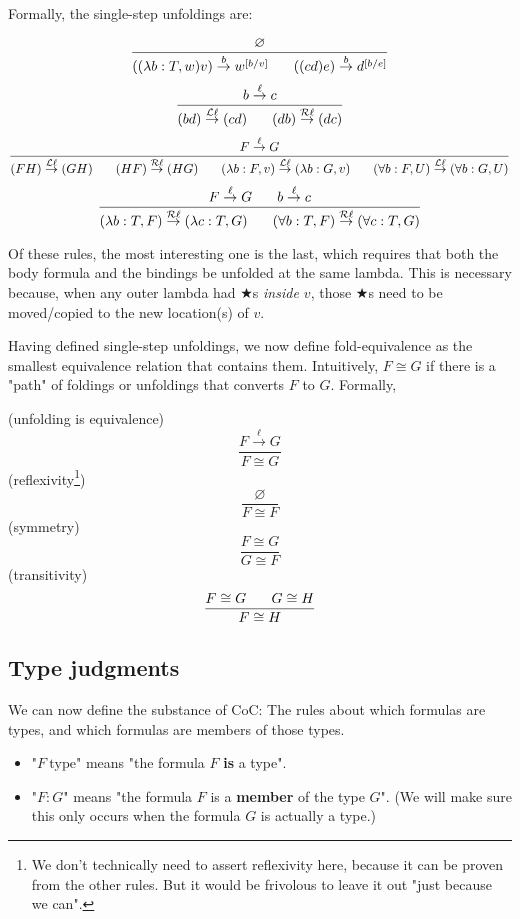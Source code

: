 \documentclass{article}
\newcommand{\istype}{\ \mathrm{type}}
\newcommand{\presep}{\hspace{1.8em}}
\newcommand{\subst}[3]{#1^{[{#2}{/}{#3}]}}
\newcommand{\bindvariable}{\bigstar}
\newcommand{\betaeq}{\cong}
\newcommand{\betared}[1]{\overset{#1}{\rightarrow}}
\newcommand{\anywhat}{\ell}
\begin{document}
  Formally, the single-step unfoldings are:
  
\[ \frac{\varnothing}{((\lambda b:T,w)v) \betared{b} \subst{w}{b}{v} \presep ((c d) e) \betared{b} \subst{d}{b}{e}} \]
\[ \frac{b \betared{\anywhat} c}{(b d) \betared{\mathcal{L}\anywhat} (c d) \presep (d b)\betared{\mathcal{R}\anywhat} (d c)} \]
\[ \frac{F \betared{\anywhat} G}{(F H) \betared{\mathcal{L}\anywhat} (G H) \presep (H F) \betared{\mathcal{R}\anywhat} (H G) \presep (\lambda b:F,v) \betared{\mathcal{L}\anywhat} (\lambda b:G,v) \presep (\forall b:F,U) \betared{\mathcal{L}\anywhat} (\forall b:G,U)} \]
\[ \frac{F \betared{\anywhat} G \presep b \betared{\anywhat} c}{(\lambda b:T,F) \betared{\mathcal{R}\anywhat} (\lambda c:T,G) \presep (\forall b:T,F) \betared{\mathcal{R}\anywhat} (\forall c:T,G)} \]

Of these rules, the most interesting one is the last, which requires that both the body formula and the bindings be unfolded at the same lambda. This is necessary because, when any outer lambda had $\bindvariable$s \emph{inside $v$}, those $\bindvariable$s need to be moved/copied to the new location(s) of $v$. 

Having defined single-step unfoldings, we now define fold-equivalence as the smallest equivalence relation that contains them. Intuitively, $F \betaeq G$ if there is a "path" of foldings or unfoldings that converts $F$ to $G$. Formally,

(unfolding is equivalence)
\[ \frac{F \betared{\anywhat} G}{F \betaeq G} \]
(reflexivity\footnote{We don't technically need to assert reflexivity here, because it can be proven from the other rules. But it would be frivolous to leave it out "just because we can".})
\[ \frac{\varnothing}{F \betaeq F} \]
(symmetry)
\[ \frac{F \betaeq G}{G \betaeq F} \]
(transitivity)
\[ \frac{F \betaeq G \presep G \betaeq H}{F \betaeq H} \]
  
  \subsection{Type judgments}
  
  We can now define the substance of CoC: The rules about which formulas are types, and which formulas are members of those types.
  
  \begin{itemize}
  \item "$F\istype$" means "the formula $F$ \textbf{is} a type".
  \item "$F : G$" means "the formula $F$ is a \textbf{member} of the type $G$". (We will make sure this only occurs when the formula $G$ is actually a type.)
  \end{itemize}
  
\end{document}
